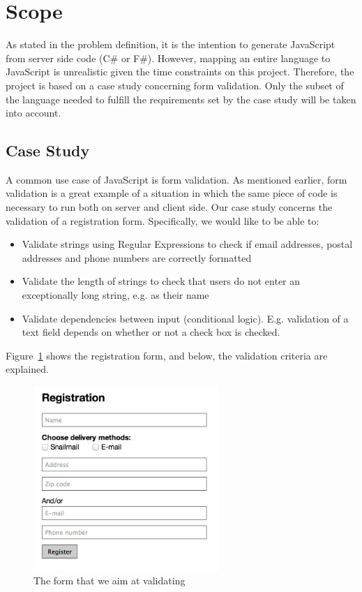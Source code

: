 \section{Scope}
	As stated in the problem definition, it is the intention to generate JavaScript from server side code (C\# or F\#). However, mapping an entire language to JavaScript is unrealistic given the time constraints on this project. Therefore, the project is based on a case study concerning form validation. Only the subset of the language needed to fulfill the requirements set by the case study will be taken into account.

	\subsection{Case Study}
		\label{subs:introduction_case_study}
		A common use case of JavaScript is form validation. As mentioned earlier, form validation is a great example of a situation in which the same piece of code is necessary to run both on server and client side. Our case study concerns the validation of a registration form. Specifically, we would like to be able to:

		\begin{itemize}
			\item Validate strings using Regular Expressions to check if email addresses, postal addresses and phone numbers are correctly formatted
			\item Validate the length of strings to check that users do not enter an exceptionally long string, e.g. as their name
			\item Validate dependencies between input (conditional logic). E.g. validation of a text field depends on whether or not a check box is checked.
		\end{itemize}

		Figure~\ref{registrationForm} shows the registration form, and below, the validation criteria are explained.

		\begin{figure}
			\begin{center}
				\centerline{\includegraphics[width=7cm]{resources/images/registrationform.png}}
			\end{center}
			\caption{The form that we aim at validating}
			\label{registrationForm}
		\end{figure}

